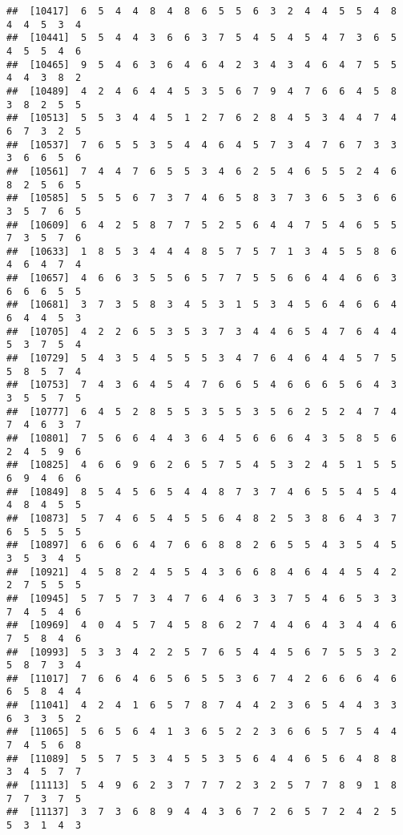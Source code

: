 \documentclass[
]{book}
\begin{document}
\begin{verbatim}
##  [10417]  6  5  4  4  8  4  8  6  5  5  6  3  2  4  4  5  5  4  8  4  4  5  3  4
##  [10441]  5  5  4  4  3  6  6  3  7  5  4  5  4  5  4  7  3  6  5  4  5  5  4  6
##  [10465]  9  5  4  6  3  6  4  6  4  2  3  4  3  4  6  4  7  5  5  4  4  3  8  2
##  [10489]  4  2  4  6  4  4  5  3  5  6  7  9  4  7  6  6  4  5  8  3  8  2  5  5
##  [10513]  5  5  3  4  4  5  1  2  7  6  2  8  4  5  3  4  4  7  4  6  7  3  2  5
##  [10537]  7  6  5  5  3  5  4  4  6  4  5  7  3  4  7  6  7  3  3  3  6  6  5  6
##  [10561]  7  4  4  7  6  5  5  3  4  6  2  5  4  6  5  5  2  4  6  8  2  5  6  5
##  [10585]  5  5  5  6  7  3  7  4  6  5  8  3  7  3  6  5  3  6  6  3  5  7  6  5
##  [10609]  6  4  2  5  8  7  7  5  2  5  6  4  4  7  5  4  6  5  5  7  3  5  7  6
##  [10633]  1  8  5  3  4  4  4  8  5  7  5  7  1  3  4  5  5  8  6  4  6  4  7  4
##  [10657]  4  6  6  3  5  5  6  5  7  7  5  5  6  6  4  4  6  6  3  6  6  6  5  5
##  [10681]  3  7  3  5  8  3  4  5  3  1  5  3  4  5  6  4  6  6  4  6  4  4  5  3
##  [10705]  4  2  2  6  5  3  5  3  7  3  4  4  6  5  4  7  6  4  4  5  3  7  5  4
##  [10729]  5  4  3  5  4  5  5  5  3  4  7  6  4  6  4  4  5  7  5  5  8  5  7  4
##  [10753]  7  4  3  6  4  5  4  7  6  6  5  4  6  6  6  5  6  4  3  3  5  5  7  5
##  [10777]  6  4  5  2  8  5  5  3  5  5  3  5  6  2  5  2  4  7  4  7  4  6  3  7
##  [10801]  7  5  6  6  4  4  3  6  4  5  6  6  6  4  3  5  8  5  6  2  4  5  9  6
##  [10825]  4  6  6  9  6  2  6  5  7  5  4  5  3  2  4  5  1  5  5  6  9  4  6  6
##  [10849]  8  5  4  5  6  5  4  4  8  7  3  7  4  6  5  5  4  5  4  4  8  4  5  5
##  [10873]  5  7  4  6  5  4  5  5  6  4  8  2  5  3  8  6  4  3  7  6  5  5  5  5
##  [10897]  6  6  6  6  4  7  6  6  8  8  2  6  5  5  4  3  5  4  5  3  5  3  4  5
##  [10921]  4  5  8  2  4  5  5  4  3  6  6  8  4  6  4  4  5  4  2  2  7  5  5  5
##  [10945]  5  7  5  7  3  4  7  6  4  6  3  3  7  5  4  6  5  3  3  7  4  5  4  6
##  [10969]  4  0  4  5  7  4  5  8  6  2  7  4  4  6  4  3  4  4  6  7  5  8  4  6
##  [10993]  5  3  3  4  2  2  5  7  6  5  4  4  5  6  7  5  5  3  2  5  8  7  3  4
##  [11017]  7  6  6  4  6  5  6  5  5  3  6  7  4  2  6  6  6  4  6  6  5  8  4  4
##  [11041]  4  2  4  1  6  5  7  8  7  4  4  2  3  6  5  4  4  3  3  6  3  3  5  2
##  [11065]  5  6  5  6  4  1  3  6  5  2  2  3  6  6  5  7  5  4  4  7  4  5  6  8
##  [11089]  5  5  7  5  3  4  5  5  3  5  6  4  4  6  5  6  4  8  8  3  4  5  7  7
##  [11113]  5  4  9  6  2  3  7  7  7  2  3  2  5  7  7  8  9  1  8  7  7  3  7  5
##  [11137]  3  7  3  6  8  9  4  4  3  6  7  2  6  5  7  2  4  2  5  5  3  1  4  3

\end{verbatim}
\end{document}
